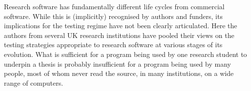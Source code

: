 Research software has fundamentally different life cycles from commercial software. While this is (implicitly) recognised by authors and funders, its implications for the testing regime have not been clearly articulated. Here the authors from several UK research institutions have pooled their views on the testing strategies appropriate to research software at various stages of its evolution. What is sufficient for a program being used by one research student to underpin a thesis is probably insufficient for a program being used by many people, most of whom never read the source, in many institutions, on a wide range of computers.
